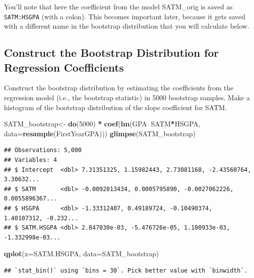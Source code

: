 \documentclass[]{article}
\newenvironment{Shaded}{\begin{snugshade}}{\end{snugshade}}
\newcommand{\DataTypeTok}[1]{\textcolor[rgb]{0.13,0.29,0.53}{#1}}
\newcommand{\DecValTok}[1]{\textcolor[rgb]{0.00,0.00,0.81}{#1}}
\newcommand{\KeywordTok}[1]{\textcolor[rgb]{0.13,0.29,0.53}{\textbf{#1}}}
\newcommand{\NormalTok}[1]{#1}
\newcommand{\OperatorTok}[1]{\textcolor[rgb]{0.81,0.36,0.00}{\textbf{#1}}}
\newcommand{\StringTok}[1]{\textcolor[rgb]{0.31,0.60,0.02}{#1}}
\begin{document}
You'll note that here the coefficient from the model SATM\_orig is saved
as \texttt{SATM:HSGPA} (with a colon). This becomes important later,
because it gets saved with a different name in the bootstrap
distribution that you will calculate below.

\hypertarget{construct-the-bootstrap-distribution-for-regression-coefficients}{%
\subsection{Construct the Bootstrap Distribution for Regression
Coefficients}\label{construct-the-bootstrap-distribution-for-regression-coefficients}}

Construct the bootstrap distribution by estimating the coefficients from
the regression model (i.e., the bootstrap statistic) in 5000 bootstrap
samples. Make a histogram of the bootstrap distribution of the slope
coefficient for SATM.

\begin{Shaded}
\begin{Highlighting}[]
\NormalTok{SATM_bootstrap<-}\StringTok{ }\KeywordTok{do}\NormalTok{(}\DecValTok{5000}\NormalTok{) }\OperatorTok{*}\StringTok{ }\KeywordTok{coef}\NormalTok{(}\KeywordTok{lm}\NormalTok{(GPA}\OperatorTok{~}\NormalTok{SATM}\OperatorTok{*}\NormalTok{HSGPA, }\DataTypeTok{data=}\KeywordTok{resample}\NormalTok{(FirstYearGPA)))}
\KeywordTok{glimpse}\NormalTok{(SATM_bootstrap)}
\end{Highlighting}
\end{Shaded}

\begin{verbatim}
## Observations: 5,000
## Variables: 4
## $ Intercept  <dbl> 7.31351325, 1.15982443, 2.73081168, -2.43560764, 3.30632...
## $ SATM       <dbl> -0.0092813434, 0.0005795890, -0.0027062226, 0.0055896367...
## $ HSGPA      <dbl> -1.33312407, 0.49189724, -0.10490374, 1.40107312, -0.232...
## $ SATM.HSGPA <dbl> 2.847030e-03, -5.476726e-05, 1.100933e-03, -1.332998e-03...
\end{verbatim}

\begin{Shaded}
\begin{Highlighting}[]
\KeywordTok{qplot}\NormalTok{(}\DataTypeTok{x=}\NormalTok{SATM.HSGPA, }\DataTypeTok{data=}\NormalTok{SATM_bootstrap)}
\end{Highlighting}
\end{Shaded}

\begin{verbatim}
## `stat_bin()` using `bins = 30`. Pick better value with `binwidth`.
\end{verbatim}
\end{document}
